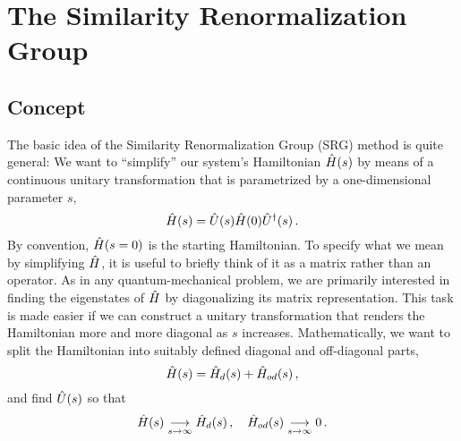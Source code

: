 \section{\label{sec:srg}The Similarity Renormalization Group}


\subsection{Concept}
The basic idea of the Similarity Renormalization Group (SRG) method is 
quite general: We want to ``simplify'' our system's Hamiltonian
$\hat{H}(s)$ by means of a continuous unitary transformation that is parametrized
by a one-dimensional parameter $s$,
\begin{equation}\label{eq:cut}
  \HO(s)=\UO(s)\HO(0)\UUO(s)\,.
\end{equation}
By convention, $\hat{H}(s=0)$ is the starting Hamiltonian. To specify what we mean by 
simplifying $\hat{H}$, it is useful to briefly think of it as a matrix rather than an 
operator. As in any quantum-mechanical problem, we are primarily interested in 
finding the eigenstates of $\hat{H}$ by diagonalizing its matrix representation. This task 
is made easier if we can construct a unitary transformation that renders the Hamiltonian 
more and more diagonal as $s$ increases. Mathematically, we want to split the Hamiltonian 
into suitably defined diagonal and off-diagonal parts,
\begin{equation}
  \hat{H}(s) = \hat{H}_d(s) + \hat{H}_{od}(s)\,,
\end{equation}
and find $\hat{U}(s)$ so that
\begin{equation}\label{eq:trafo_goal}
  \HO(s)\underset{s\to\infty}{\longrightarrow}\HO_d(s)\,,\quad \HO_{od}(s)\underset{s\to\infty}{\longrightarrow} 0\,.
\end{equation}


